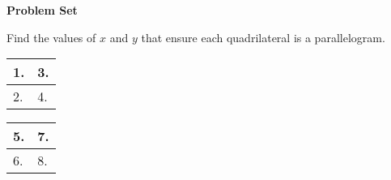 \def\figdir{/storage/emulated/0/Documents/documents/latex/1920/Grade-8/3rd/proving-parallelograms/f}
\def\lenB{1.5in}

\textbf{Problem Set}

\vspce

Find the values of $x$ and $y$ that ensure each quadrilateral is a parallelogram. 

\begin{center}

\noindent\begin{minipage}{\textwidth}
\begin{tabularx}{\textwidth}{|X|X|}
\hline
1. 
& 
3. \\
\hline
2. 
& 
4. \\
\hline
\end{tabularx} 
\end{minipage}
\end{center} 

\newpage 

\begin{center}
\noindent\begin{minipage}{\textwidth}
\begin{tabularx}{\textwidth}{|X|X|}
\hline 
5. 
& 
7. \\
\hline
6. 
& 
8. \\
\hline
\end{tabularx} 
\end{minipage}
\end{center} 
 